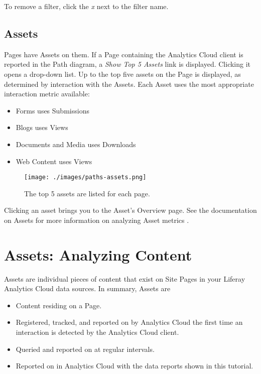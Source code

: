 To remove a filter, click the \emph{x} next to the filter name.

\subsection{Assets}\label{assets-1}

Pages have Assets on them. If a Page containing the Analytics Cloud
client is reported in the Path diagram, a \emph{Show Top 5 Assets} link
is displayed. Clicking it opens a drop-down list. Up to the top five
assets on the Page is displayed, as determined by interaction with the
Assets. Each Asset uses the most appropriate interaction metric
available:

\begin{itemize}
\tightlist
\item
  Forms uses Submissions
\item
  Blogs uses Views
\item
  Documents and Media uses Downloads
\item
  Web Content uses Views
\end{itemize}

\begin{figure}
\centering
\texttt{[image: ./images/paths-assets.png]}
\caption{The top 5 assets are listed for each page.}
\end{figure}

Clicking an asset brings you to the Asset's Overview page. See the
documentation on Assets for more information on analyzing Asset metrics
.

\section{Assets: Analyzing Content}\label{assets-analyzing-content}

Assets are individual pieces of content that exist on Site Pages in your
Liferay Analytics Cloud data sources. In summary, Assets are

\begin{itemize}
\tightlist
\item
  Content residing on a Page.
\item
  Registered, tracked, and reported on by Analytics Cloud the first time
  an interaction is detected by the Analytics Cloud client.
\item
  Queried and reported on at regular intervals.
\item
  Reported on in Analytics Cloud with the data reports shown in this
  tutorial.
\end{itemize}


